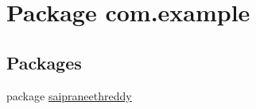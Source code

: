 \hypertarget{namespacecom_1_1example}{}\section{Package com.\+example}
\label{namespacecom_1_1example}
\subsection*{Packages}
\begin{DoxyCompactItemize}
\item 
package \hyperlink{namespacecom_1_1example_1_1saipraneethreddy}{saipraneethreddy}
\end{DoxyCompactItemize}
